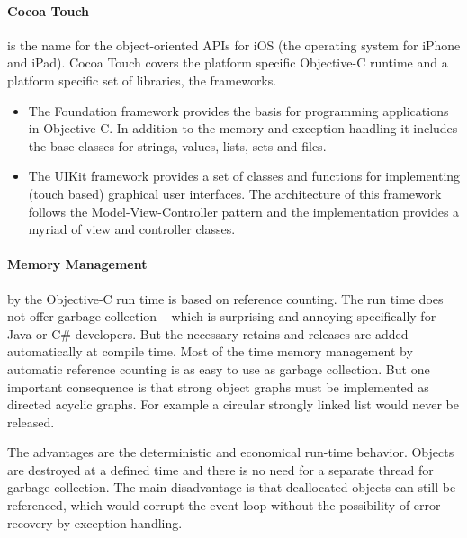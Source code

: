 \paragraph{Cocoa Touch}
\label{sec:Cocoa}
is the name for the object-oriented APIs for iOS (the operating system for iPhone and iPad). 
Cocoa Touch covers the platform specific Objective-C runtime and a platform specific set of libraries, the frameworks.

\begin{itemize}
\item\label{secitem:CocoaFoundation}
The Foundation framework provides the basis for programming applications in Objective-C. 
In addition to the memory and exception handling it includes the base classes for strings, values, lists, sets and files.
\item\label{secitem:CocoaUIKit} The UIKit framework provides a set of classes and functions for implementing (touch based) graphical user interfaces. 
The architecture of this framework follows the Model-View-Controller pattern 
and the implementation provides a myriad of view and controller classes.
\end{itemize}

\paragraph{Memory Management} 
\label{sec:MemoryManagement}
by the Objective-C run time is based on reference counting. 
The run time does not offer  garbage collection – which is surprising and annoying specifically for Java or C\# developers. 
But the necessary retains and releases are added automatically at compile time.
Most of the time memory management by automatic reference counting is as easy to use as garbage collection.
But one important consequence is that strong object graphs must be implemented as directed acyclic graphs. 
For example a circular strongly linked list would never be released. 

The advantages are the deterministic and economical run-time behavior.
Objects are destroyed at a defined time and there is no need for a separate thread for garbage collection. 
The main disadvantage is that deallocated objects can still be referenced, 
which would corrupt the event loop
without the possibility of error recovery by exception handling.



